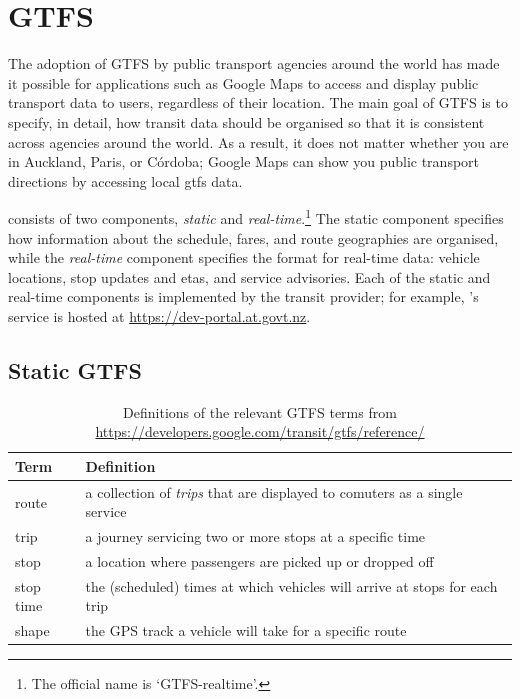 \section{GTFS}
\label{sec:gtfs}

\glsresetall{}

The adoption of GTFS \citep{GoogleDevelopers_2006} by public transport agencies around the world has made it possible for applications such as Google Maps to access and display public transport data to users, regardless of their location. The main goal of GTFS is to specify, in detail, how transit data should be organised so that it is consistent across agencies around the world. As a result, it does not matter whether you are in Auckland, Paris, or C\'ordoba; Google Maps can show you public transport directions by accessing local \gls{gtfs} data.


\GTFS{} consists of two components, \emph{static} and \emph{real-time}.\footnote{The official name is `GTFS-realtime'.} The static component specifies how information about the schedule, fares, and route geographies are organised, while the \emph{real-time} component specifies the format for real-time data: vehicle locations, stop updates and \glspl{eta}, and service advisories. Each of the static and real-time components is implemented by the transit provider; for example, \AT{}'s \GTFS{} service is hosted at \mbox{\url{https://dev-portal.at.govt.nz}}.


\subsection{Static GTFS}
\label{sec:gtfs_static}


\begin{table}[t]
\centering
\fontsize{10}{12}\selectfont
\begin{tabular}{ll}
\toprule
Term & Definition \\
\midrule
route & a collection of \emph{trips} that are displayed to comuters
as a single service \\
trip & a journey servicing two or more stops at a specific time \\
stop & a location where passengers are picked up or dropped off \\
stop time & the (scheduled) times at which vehicles
will arrive at stops for each trip \\
shape & the GPS track a vehicle will take for a specific route \\
\bottomrule
\end{tabular}
\caption[Definitions of GTFS terms]{Definitions of the relevant GTFS terms from \url{https://developers.google.com/transit/gtfs/reference/}}
\label{tab:gtfs_terms}
\end{table}


